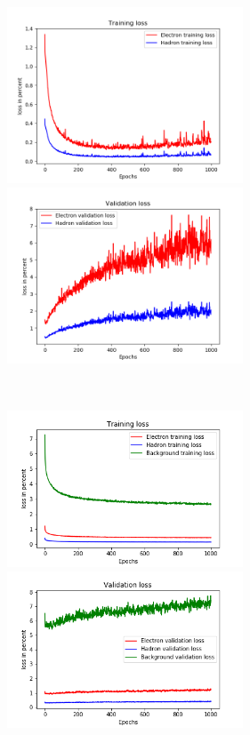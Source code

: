 \begin{figure}
\centering
\begin{minipage}{0.45\textwidth}
\includegraphics[width=7cm]{trainlossbinary.png}
\end{minipage}
\begin{minipage}{0.45\textwidth}
\includegraphics[width=7cm]{vallossbinary.png}
\end{minipage}
\\
\begin{minipage}{0.45\textwidth}
\includegraphics[width=7cm]{trainloss.png}
\end{minipage}
\begin{minipage}{0.45\textwidth}
\includegraphics[width=7cm]{valloss.png}

\end{minipage}
\end{figure}
